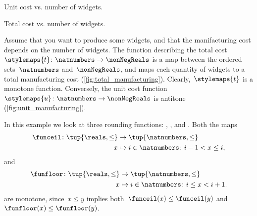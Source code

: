 \begin{marginfigure}
	\caption{Unit cost vs. number of widgets.}
	\label{fig:unit_manufacturing}
\end{marginfigure}

\begin{marginfigure}
	\caption{Total cost vs. number of widgets.}
	\label{fig:total_manufacturing}
\end{marginfigure}

\begin{example}
	Assume that you want to produce some widgets, and that the manifacturing cost depends on the number of widgets.
	The function describing the total cost~$\stylemaps{t}\colon \natnumbers\to \nonNegReals$ is a map between the ordered sets~$\natnumbers$ and~$\nonNegReals$, and maps each quantity of widgets to a total manufacturing cost (\cref{fig:total_manufacturing}).
	Clearly,~$\stylemaps{t}$ is a monotone function.
	Conversely, the unit cost function~$\stylemaps{u}\colon \natnumbers\to \nonNegReals$ is antitone (\cref{fig:unit_manufacturing}).
\end{example}

\begin{example}
	\label{ex:rounding-functions}
	In this example we look at three rounding functions: \funceil, \funfloor, and \rtntte.
	Both the maps
	\begin{equation*}
		\begin{aligned}
			\funceil\colon \tup{\reals,\leq} & \to \tup{\natnumbers,\leq}                    \\
			x                                & \mapsto i \in \natnumbers \colon i-1<x\leq i,
		\end{aligned}
	\end{equation*}
	and
	\begin{equation*}
		\begin{aligned}
			\funfloor\colon \tup{\reals,\leq} & \to \tup{\natnumbers,\leq}                     \\
			x                                 & \mapsto i \in \natnumbers \colon i\leq x< i+1.
		\end{aligned}
	\end{equation*}
	are monotone, since~$x\leq y$ implies both~$\funceil(x)\leq \funceil(y)$ and~$\funfloor(x)\leq\funfloor(y)$.
\end{example}

